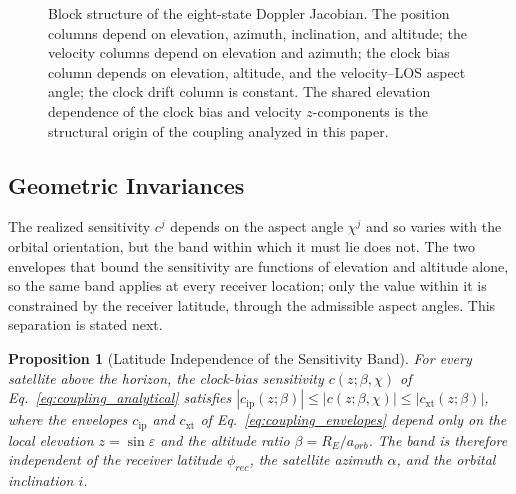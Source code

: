 \documentclass[letterpaper,times]{IONconf-v2}
\theoremstyle{plain}
\newtheorem{proposition}{Proposition}
\theoremstyle{remark}
\begin{document}
\begin{figure}[htb]
{%
}\caption{Block structure of the eight-state Doppler Jacobian. The position columns depend on elevation, azimuth, inclination, and altitude; the velocity columns depend on elevation and azimuth; the clock bias column depends on elevation, altitude, and the velocity--LOS aspect angle; the clock drift column is constant. The shared elevation dependence of the clock bias and velocity $z$-components is the structural origin of the coupling analyzed in this paper.}
\label{fig:jacobian_blocks}
\vspace{-10pt}
\end{figure}

\vspace{-10pt}

\subsection{Geometric Invariances}\label{subsec:invariances}

The realized sensitivity $c^j$ depends on the aspect angle $\chi^j$ and so varies with the orbital orientation, but the band within which it must lie does not. The two envelopes that bound the sensitivity are functions of elevation and altitude alone, so the same band applies at every receiver location; only the value within it is constrained by the receiver latitude, through the admissible aspect angles. This separation is stated next.

\begin{proposition}[Latitude Independence of the Sensitivity Band]\label{prop:latitude_independence}
For every satellite above the horizon, the clock-bias sensitivity $c(z;\beta,\chi)$ of Eq.~\eqref{eq:coupling_analytical} satisfies $|c_{\mathrm{ip}}(z;\beta)| \le |c(z;\beta,\chi)| \le |c_{\mathrm{xt}}(z;\beta)|$, where the envelopes $c_{\mathrm{ip}}$ and $c_{\mathrm{xt}}$ of Eq.~\eqref{eq:coupling_envelopes} depend only on the local elevation $z = \sin\varepsilon$ and the altitude ratio $\beta = R_E/a_{orb}$. The band is therefore independent of the receiver latitude $\phi_{rec}$, the satellite azimuth $\alpha$, and the orbital inclination $i$.
\end{proposition}
\end{document}
